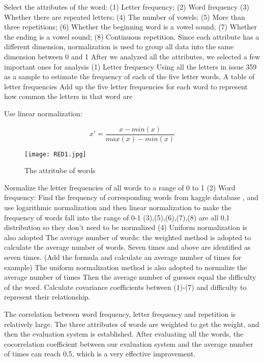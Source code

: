\documentclass[12pt]{article}  %
\begin{document}
Select the attributes of the word: (1) Letter frequency; (2) Word frequency (3) Whether there are repeated letters; (4) The number of vowels; (5) More than three repetitions; (6) Whether the beginning word is a vowel sound; (7) Whether the ending is a vowel sound; (8) Continuous repetition.
Since each attribute has a different dimension, normalization is used to group all data into the same dimension between 0 and 1
After we analyzed all the attributes, we selected a few important ones for analysis
(1) Letter frequency
Using all the letters in issue 359 as a sample to estimate the frequency of each of the five letter words,
A table of letter frequencies
Add up the five letter frequencies for each word to represent how common the letters in that word are


Use linear normalization:

\begin{equation}
	x' = \frac{x-min(x)}{max(x)-min(x)}
\end{equation}

\begin{figure}[htbp]
	\centering
	\texttt{[image: RED1.jpg]}
	\caption{ The attritube of words}\label{fig:result}
\end{figure}



Normalize the letter frequencies of all words to a range of 0 to 1
(2) Word frequency: Find the frequency of corresponding words from kaggle database\cite{3} , and use logarithmic normalization and then linear normalization to make the frequency of words fall into the range of 0-1
(3),(5),(6),(7),(8) are all 0,1 distribution so they don't need to be normalized
(4) Uniform normalization is also adopted
The average number of words: the weighted method is adopted to calculate the average number of words. Seven times and above are identified as seven times. (Add the formula and calculate an average number of times for example) The uniform normalization method is also adopted to normalize the average number of times
Then the average number of guesses equal the difficulty of the word.
Calculate covariance coefficients between (1)-(7) and difficulty to represent their relationship.



The correlation between word frequency, letter frequency and repetition is relatively large. The three attributes of words are weighted to get the weight, and then the evaluation system is established. After evaluating all the words, the cocorrelation coefficient between our evaluation system and the average number of times can reach 0.5, which is a very effective improvement.
\end{document}
